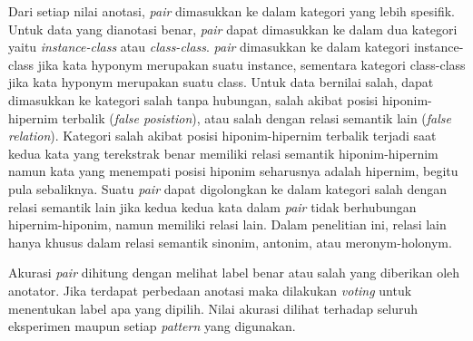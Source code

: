 Dari setiap nilai anotasi, \textit{pair} dimasukkan ke dalam kategori yang lebih spesifik. Untuk data yang dianotasi benar, \textit{pair} dapat dimasukkan ke dalam dua kategori yaitu \textit{instance-class} atau \textit{class-class}. \textit{pair} dimasukkan ke dalam kategori instance-class jika kata hyponym merupakan suatu instance, sementara kategori class-class jika kata hyponym merupakan suatu class. Untuk data bernilai salah, dapat dimasukkan ke kategori salah tanpa hubungan, salah akibat posisi hiponim-hipernim terbalik (\textit{false posistion}), atau salah dengan relasi semantik lain (\textit{false relation}). Kategori salah akibat posisi hiponim-hipernim terbalik terjadi saat kedua kata yang terekstrak benar memiliki relasi semantik hiponim-hipernim namun kata yang menempati posisi hiponim seharusnya adalah hipernim, begitu pula sebaliknya. Suatu \textit{pair} dapat digolongkan ke dalam kategori salah dengan relasi semantik lain jika kedua kedua kata dalam \textit{pair} tidak berhubungan hipernim-hiponim, namun memiliki relasi lain. Dalam penelitian ini, relasi lain hanya khusus dalam relasi semantik sinonim, antonim, atau meronym-holonym.

Akurasi \textit{pair} dihitung dengan melihat label benar atau salah yang diberikan oleh anotator. Jika terdapat perbedaan anotasi maka dilakukan \textit{voting} untuk menentukan label apa yang dipilih. Nilai akurasi dilihat terhadap seluruh eksperimen maupun setiap \textit{pattern} yang digunakan.


